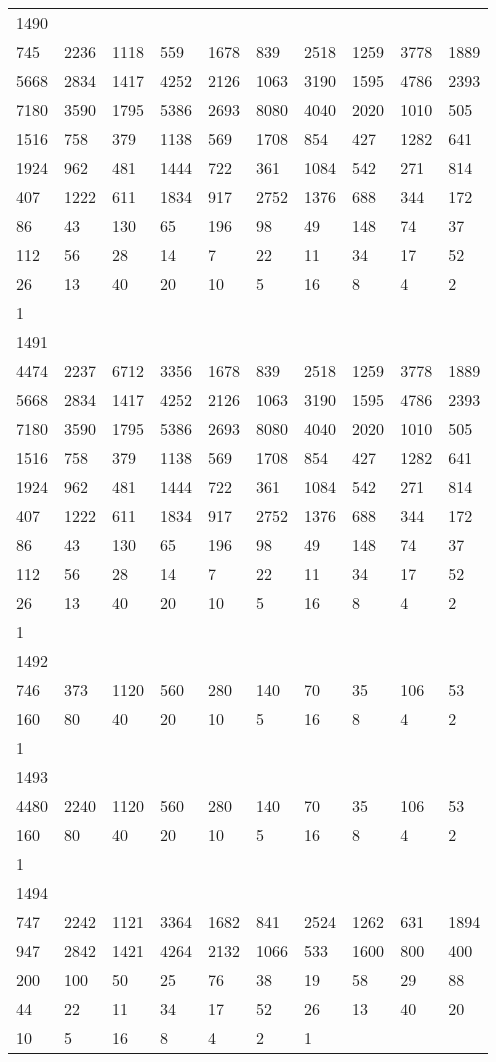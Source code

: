 \begin{longtable}{*{10}{l}}
1490&&&&&&&&&\\
745& 2236& 1118& 559& 1678& 839& 2518& 1259& 3778& 1889\\
5668& 2834& 1417& 4252& 2126& 1063& 3190& 1595& 4786& 2393\\
7180& 3590& 1795& 5386& 2693& 8080& 4040& 2020& 1010& 505\\
1516& 758& 379& 1138& 569& 1708& 854& 427& 1282& 641\\
1924& 962& 481& 1444& 722& 361& 1084& 542& 271& 814\\
407& 1222& 611& 1834& 917& 2752& 1376& 688& 344& 172\\
86& 43& 130& 65& 196& 98& 49& 148& 74& 37\\
112& 56& 28& 14& 7& 22& 11& 34& 17& 52\\
26& 13& 40& 20& 10& 5& 16& 8& 4& 2\\
1& \\

1491&&&&&&&&&\\
4474& 2237& 6712& 3356& 1678& 839& 2518& 1259& 3778& 1889\\
5668& 2834& 1417& 4252& 2126& 1063& 3190& 1595& 4786& 2393\\
7180& 3590& 1795& 5386& 2693& 8080& 4040& 2020& 1010& 505\\
1516& 758& 379& 1138& 569& 1708& 854& 427& 1282& 641\\
1924& 962& 481& 1444& 722& 361& 1084& 542& 271& 814\\
407& 1222& 611& 1834& 917& 2752& 1376& 688& 344& 172\\
86& 43& 130& 65& 196& 98& 49& 148& 74& 37\\
112& 56& 28& 14& 7& 22& 11& 34& 17& 52\\
26& 13& 40& 20& 10& 5& 16& 8& 4& 2\\
1& \\

1492&&&&&&&&&\\
746& 373& 1120& 560& 280& 140& 70& 35& 106& 53\\
160& 80& 40& 20& 10& 5& 16& 8& 4& 2\\
1& \\

1493&&&&&&&&&\\
4480& 2240& 1120& 560& 280& 140& 70& 35& 106& 53\\
160& 80& 40& 20& 10& 5& 16& 8& 4& 2\\
1& \\

1494&&&&&&&&&\\
747& 2242& 1121& 3364& 1682& 841& 2524& 1262& 631& 1894\\
947& 2842& 1421& 4264& 2132& 1066& 533& 1600& 800& 400\\
200& 100& 50& 25& 76& 38& 19& 58& 29& 88\\
44& 22& 11& 34& 17& 52& 26& 13& 40& 20\\
10& 5& 16& 8& 4& 2& 1& \\


\end{longtable}
